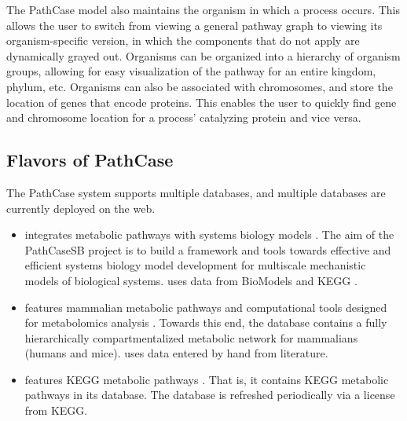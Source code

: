 The PathCase model also maintains the organism in which a process occurs.  This
allows the user to switch from viewing a general pathway graph to viewing its
organism-specific version, in which the components that do not apply are
dynamically grayed out. Organisms can be organized into a hierarchy of organism
groups, allowing for easy visualization of the pathway for an entire kingdom,
phylum, etc.  Organisms can also be associated with chromosomes, and store the
location of genes that encode proteins. This enables the user to quickly find
gene and chromosome location for a process’ catalyzing protein and vice versa.

\subsection{Flavors of PathCase}
\label{sect:pathcase_flavors}

The PathCase system supports multiple databases, and multiple databases are
currently deployed on the web.

\begin{itemize}

    \item \pathcasesb integrates metabolic pathways with systems biology models
        \cite{pathcase-basic}. The aim of the PathCaseSB project is to build a
        framework and tools towards effective and efficient systems biology
        model development for multiscale mechanistic models of biological
        systems. \pathcasesb uses data from BioModels and KEGG
        \cite{pathcase-basic}.

    \item \pathcasemaw features mammalian metabolic pathways and computational
        tools designed for metabolomics analysis \cite{pathcase-basic}. Towards
        this end, the \pathcasemaw database contains a fully hierarchically
        compartmentalized metabolic network for mammalians (humans and mice).
        \pathcasemaw uses data entered by hand from literature.

    \item \pathcasekegg features KEGG metabolic pathways \cite{pathcase-basic}.
        That is, it contains KEGG metabolic pathways in its database. The
        \pathcasekegg database is refreshed periodically via a license from
        KEGG.
        
\end{itemize}
